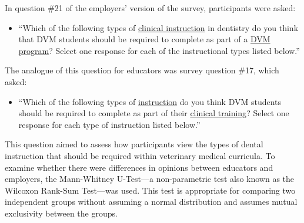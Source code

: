 \documentclass[
  11pt,
  letterpaper,
  DIV=11,
  numbers=noendperiod]{scrartcl}
\providecommand{\tightlist}{%
  \setlength{\itemsep}{0pt}\setlength{\parskip}{0pt}}
\numberwithin{figure}{section}
\begin{document}
In question \#21 of the employers' version of the survey, participants
were asked:

\begin{itemize}
\tightlist
\item
  ``Which of the following types of \ul{clinical instruction} in
  dentistry do you think that DVM students should be required to
  complete as part of a \ul{DVM program}? Select one response for each
  of the instructional types listed below.''
\end{itemize}

The analogue of this question for educators was survey question \#17,
which asked:

\begin{itemize}
\tightlist
\item
  ``Which of the following types of \ul{instruction} do you think DVM
  students should be required to complete as part of their \ul{clinical
  training}? Select one response for each type of instruction listed
  below.''
\end{itemize}

This question aimed to assess how participants view the types of dental
instruction that should be required within veterinary medical curricula.
To examine whether there were differences in opinions between educators
and employers, the Mann-Whitney U-Test---a non-parametric test also
known as the Wilcoxon Rank-Sum Test---was used. This test is appropriate
for comparing two independent groups without assuming a normal
distribution and assumes mutual exclusivity between the groups.
\end{document}
